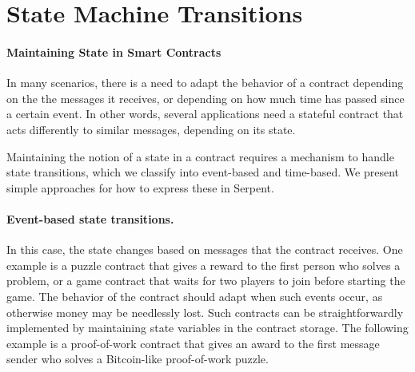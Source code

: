\documentclass[12pt]{article}
\begin{document}
\section{State Machine Transitions}

\paragraph{Maintaining State in Smart Contracts}

In many scenarios, there is a need to adapt the behavior of a contract depending on the the messages it receives, or depending on how much time has passed since a certain event. In other words, several applications need a stateful contract that acts differently to similar messages, depending on its state.

Maintaining the notion of a state in a contract requires a mechanism to handle state transitions, which we classify into event-based and time-based. We present simple approaches for how to express these in Serpent.

\paragraph{Event-based state transitions.}

In this case, the state changes based on messages that the contract receives. One example is a puzzle contract that gives a reward to the first person who solves a problem, or a game contract that waits for two players to join before starting the game. The behavior of the contract should adapt when such events occur, as otherwise money may be needlessly lost. Such contracts can be straightforwardly implemented by maintaining state variables in the contract storage. The following example is a proof-of-work contract that gives an award to the first message sender who solves a Bitcoin-like proof-of-work puzzle.

\end{document}
